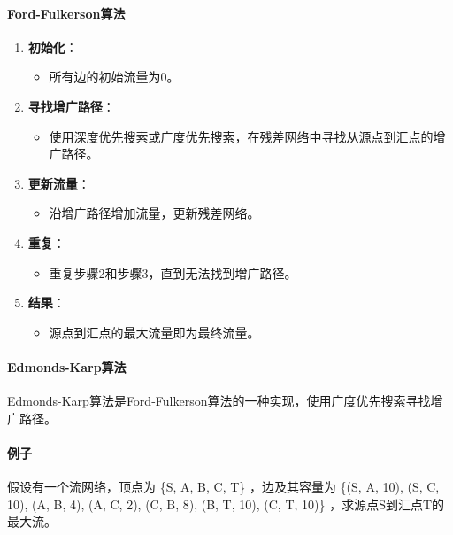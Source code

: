 \documentclass[UTF8]{ctexart}
\begin{document}
\paragraph{Ford-Fulkerson算法}
\begin{enumerate}
    \item \textbf{初始化}：
        \begin{itemize}
            \item 所有边的初始流量为0。
        \end{itemize}
    \item \textbf{寻找增广路径}：
        \begin{itemize}
            \item 使用深度优先搜索或广度优先搜索，在残差网络中寻找从源点到汇点的增广路径。
        \end{itemize}
    \item \textbf{更新流量}：
        \begin{itemize}
            \item 沿增广路径增加流量，更新残差网络。
        \end{itemize}
    \item \textbf{重复}：
        \begin{itemize}
            \item 重复步骤2和步骤3，直到无法找到增广路径。
        \end{itemize}
    \item \textbf{结果}：
        \begin{itemize}
            \item 源点到汇点的最大流量即为最终流量。
        \end{itemize}
\end{enumerate}

\paragraph{Edmonds-Karp算法}
Edmonds-Karp算法是Ford-Fulkerson算法的一种实现，使用广度优先搜索寻找增广路径。

\paragraph{例子}
假设有一个流网络，顶点为 \{S, A, B, C, T\} ，边及其容量为 \{(S, A, 10), (S, C, 10), (A, B, 4), (A, C, 2), (C, B, 8), (B, T, 10), (C, T, 10)\} ，求源点S到汇点T的最大流。
\end{document}
